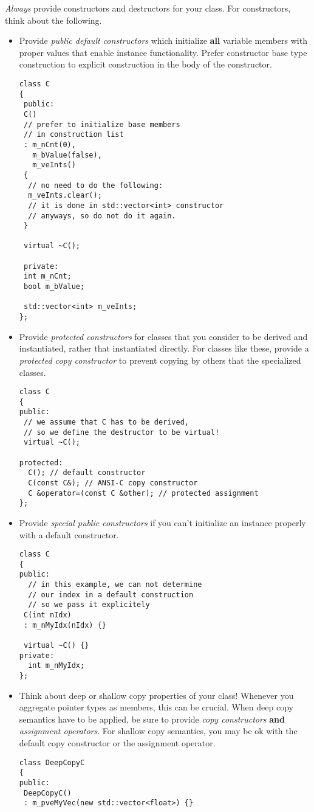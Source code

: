 \emph{Always} provide constructors and destructors for your class.
For constructors, think about the following.
\begin{itemize}
\item Provide \emph{public default constructors} which initialize \textbf{all} variable members with proper values that enable instance functionality.
Prefer constructor base type construction to explicit construction in the body of the constructor.
\begin{verbatim}
class C
{
 public:
 C()
 // prefer to initialize base members
 // in construction list
 : m_nCnt(0),
   m_bValue(false),
   m_veInts()
 {
  // no need to do the following:
  m_veInts.clear();
  // it is done in std::vector<int> constructor
  // anyways, so do not do it again.
 }
 
 virtual ~C();
 
 private:
 int m_nCnt;
 bool m_bValue;
 
 std::vector<int> m_veInts;
};
\end{verbatim}
\item Provide \emph{protected constructors} for classes that you consider to be derived and instantiated, rather that instantiated directly.
For classes like these, provide a \emph{protected copy constructor} to prevent copying by others that the specialized classes.
\begin{verbatim}
class C
{
public:
 // we assume that C has to be derived,
 // so we define the destructor to be virtual!
 virtual ~C();
 
protected:
  C(); // default constructor
  C(const C&); // ANSI-C copy constructor
  C &operator=(const C &other); // protected assignment
};
\end{verbatim}
\item Provide \emph{special public constructors} if you can't initialize an instance properly with a default constructor.
\begin{verbatim}
class C
{
public:
  // in this example, we can not determine
  // our index in a default construction
  // so we pass it explicitely
 C(int nIdx)
 : m_nMyIdx(nIdx) {}
 
 virtual ~C() {}
private:
  int m_nMyIdx;
};
\end{verbatim}
\item Think about deep or shallow copy properties of your class!
Whenever you aggregate pointer types as members, this can be crucial.
When deep copy semantics have to be applied, be sure to provide \emph{copy constructors} \textbf{and} \emph{assignment operators}.
For shallow copy semantics, you may be ok with the default copy constructor or the assignment operator.
\begin{verbatim}
class DeepCopyC
{
public:
 DeepCopyC()
 : m_pveMyVec(new std::vector<float>) {}
 

\end{verbatim}
\end{itemize}
